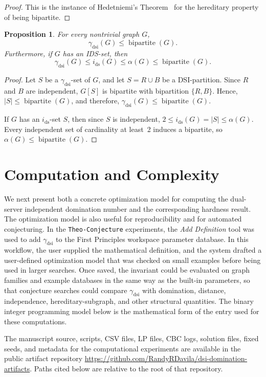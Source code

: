 \documentclass[11pt]{article}
\newtheorem{proposition}[theorem]{Proposition}
\theoremstyle{definition}
\theoremstyle{remark}
\newcommand{\ds}{\mathrm{ds}}
\newcommand{\dsi}{\mathrm{dsi}}
\newcommand{\bipnum}{\operatorname{bipartite}}
\DeclareRobustCommand{\TheoConjecture}{\texttt{Theo-Conjecture}}
\DeclareRobustCommand{\AddDefinition}{\emph{Add Definition}}
\newcommand{\ArtifactRepo}{\url{https://github.com/RandyRDavila/dsi-domination-artifacts}}
\begin{document}
\begin{proof}
This is the instance of Hedetniemi's Theorem~\cite[Theorem~2]{Hedetniemi73}
for the hereditary property of being bipartite.
\end{proof}

\begin{proposition}
\label{prop:dsi-bipartite-number}
For every nontrivial graph \(G\),
\[
   \gamma_{\dsi}(G)\le \bipnum(G).
\]
Furthermore,  if $G$ has an IDS-set, then
\[\gamma_{\dsi}(G) \le i_{\ds}(G) \le \alpha(G) \le \bipnum(G).\]
\end{proposition}

\begin{proof}
Let \(S\) be a \(\gamma_{\dsi}\)-set of \(G\), and let \(S=R\cup B\) be a
DSI-partition. Since \(R\) and \(B\) are independent, \(G[S]\) is bipartite
with bipartition \(\{R,B\}\). Hence, \(|S|\le \bipnum(G)\), and therefore, 
\(\gamma_{\dsi}(G)\le \bipnum(G)\).

If $G$ has an $i_{\ds}$-set $S$, then since $S$ is independent, $2 \le i_{\ds}(G) = |S| \le \alpha(G)$.   Every independent set of cardinality at least~2 induces a bipartite, so $\alpha(G) \le \bipnum(G)$.  
\end{proof}


\section{Computation and Complexity}
\label{sec:computation}

We next present both a concrete optimization model for computing the dual-server independent domination number and the corresponding hardness result. The optimization model is
also useful for reproducibility and for automated conjecturing. In the
\TheoConjecture{} experiments, the \AddDefinition{} tool was used to add
\(\gamma_{\dsi}\) to the First Principles workspace parameter database. In
this workflow, the user supplied the mathematical definition, and the system
drafted a user-defined optimization model that was checked on small
examples before being used in larger searches. Once saved, the invariant
could be evaluated on graph families and example databases in the same way
as the built-in parameters, so that conjecture searches could compare
\(\gamma_{\dsi}\) with domination, distance, independence,
hereditary-subgraph, and other structural quantities. The binary integer
programming model below is the mathematical form of the entry used for
these computations.

The manuscript source, scripts, CSV files, LP files, CBC logs, solution
files, fixed seeds, and metadata for the computational experiments are
available in the public artifact repository
\ArtifactRepo. Paths cited below are relative to the root of that
repository.
\end{document}
